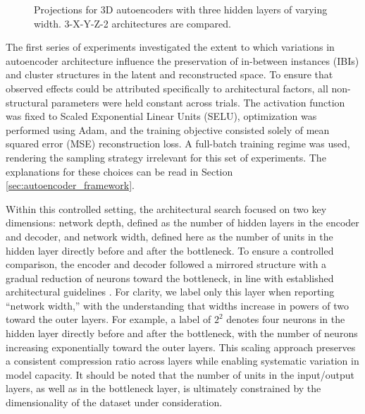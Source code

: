 \begin{figure}[htb]
  \caption{Projections for 3D autoencoders with three hidden layers of varying width. 3-X-Y-Z-2 architectures are compared.}
  \label{fig:3-X-Y-Z-2}
\end{figure}

The first series of experiments investigated the extent to which variations in autoencoder architecture influence the preservation of in-between instances (IBIs) and cluster structures in the latent and reconstructed space. To ensure that observed effects could be attributed specifically to architectural factors, all non-structural parameters were held constant across trials. The activation function was fixed to Scaled Exponential Linear Units (SELU), optimization was performed using Adam, and the training objective consisted solely of mean squared error (MSE) reconstruction loss. A full-batch training regime was used, rendering the sampling strategy irrelevant for this set of experiments. The explanations for these choices can be read in Section \ref{sec:autoencoder_framework}.

Within this controlled setting, the architectural search focused on two key dimensions: network depth, defined as the number of hidden layers in the encoder and decoder, and network width, defined here as the number of units in the hidden layer directly before and after the bottleneck. To ensure a controlled comparison, the encoder and decoder followed a mirrored structure with a gradual reduction of neurons toward the bottleneck, in line with established architectural guidelines \cite{Charte18}. For clarity, we label only this layer when reporting “network width,” with the understanding that widths increase in powers of two toward the outer layers. For example, a label of $2^2$ denotes four neurons in the hidden layer directly before and after the bottleneck, with the number of neurons increasing exponentially toward the outer layers. This scaling approach preserves a consistent compression ratio across layers while enabling systematic variation in model capacity. It should be noted that the number of units in the input/output layers, as well as in the bottleneck layer, is ultimately constrained by the dimensionality of the dataset under consideration.

